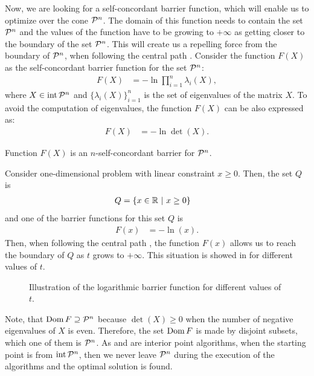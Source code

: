 Now, we are looking for a self-concordant barrier function, which will enable us to optimize over the cone $\mathcal{P}^n$.
The domain of this function needs to contain the set $\mathcal{P}^n$ and the values of the function have to be growing to $+\infty$ as getting closer to the boundary of the set $\mathcal{P}^n$.
This will create us a repelling force from the boundary of $\mathcal{P}^n$, when following the central path .
Consider the function $F(X)$ as the self-concordant barrier function for the set $\mathcal{P}^n$:
\begin{align}
  F(X) &= -\ln\prod_{i=1}^{n}\lambda_i(X),
\end{align}
where $X\in\operatorname{int}\mathcal{P}^n$ and $\big\{\lambda_i(X)\big\}_{i=1}^n$ is the set of eigenvalues of the matrix $X$.
To avoid the computation of eigenvalues, the function $F(X)$ can be also expressed as:
\begin{align}
  F(X) &= -\ln\det(X).
\end{align}

\begin{theorem}
  Function $F(X)$ is an $n$-self-concordant barrier for $\mathcal{P}^n$.
\end{theorem}

\begin{example}
  Consider one-dimensional problem with linear constraint $x \geq 0$.
  Then, the set $Q$ is
  \begin{align}
    Q &= \{x\in\mathbb{R}\ |\ x \geq 0\}
  \end{align}
  and one of the barrier functions for this set $Q$ is
  \begin{align}
    F(x) &= -\ln(x).
  \end{align}
  Then, when following the central path , the function $F(x)$ allows us to reach the boundary of $Q$ as $t$ grows to $+\infty$.
  This situation is showed in  for different values of $t$.

  \begin{figure}[ht]
    \centering
    \resizebox{0.95\textwidth}{!}{}
    \caption{Illustration of the logarithmic barrier function for different values of $t$.}
  \end{figure}
\end{example}

Note, that $\operatorname{Dom} F \supseteq \mathcal{P}^n$ because $\det(X) \geq 0$ when the number of negative eigenvalues of $X$ is even. Therefore, the set $\operatorname{Dom} F$ is made by disjoint subsets, which one of them is $\mathcal{P}^n$. As  and  are interior point algorithms, when the starting point is from $\operatorname{int}\mathcal{P}^n$, then we never leave $\mathcal{P}^n$ during the execution of the algorithms and the optimal solution is found.

